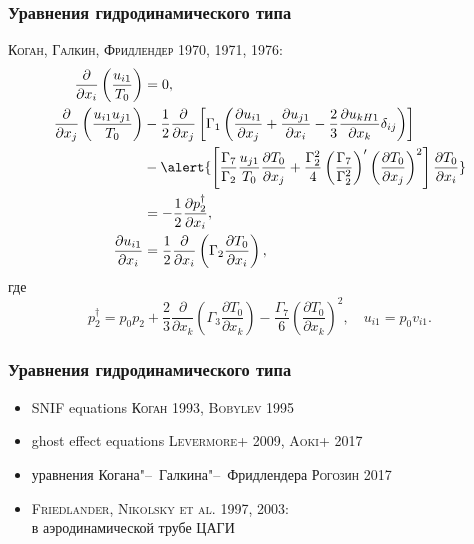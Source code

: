\documentclass[mathserif]{beamer} %
\newcommand{\pder}[2][]{\frac{\partial#1}{\partial#2}}
\newcommand{\Cite}[2][]{\alert{\textsc{#2 #1}}}
\begin{document}
\begin{frame}
    \frametitle{Уравнения гидродинамического типа}
    \Cite[1970, 1971, 1976]{Коган, Галкин, Фридлендер}:
    \begin{align*}
        \pder{x_i}\left(\frac{u_{i1}}{T_0}\right) &= 0, \\
        \pder{x_j}\left(\frac{u_{i1}u_{j1}}{T_0}\right)
            &-\frac12\pder{x_j}\left[\Gamma_1\left(
                \pder[u_{i1}]{x_j} + \pder[u_{j1}]{x_i} - \frac23\pder[u_{kH1}]{x_k}\delta_{ij}
            \right)\right] \notag\\
            &-\alert{\left[
                \frac{\Gamma_7}{\Gamma_2}\frac{u_{j1}}{T_0}\pder[T_0]{x_j}
                + \frac{\Gamma_2^2}4 \left(\frac{\Gamma_7}{\Gamma_2^2}\right)'
                    \left(\pder[T_0]{x_j}\right)^2
            \right]\pder[T_0]{x_i}} \notag\\
            &= -\frac12\pder[p_2^\dag]{x_i}, \\
        \pder[u_{i1}]{x_i} &= \frac12\pder{x_i}\left(\Gamma_2\pder[T_0]{x_i}\right),
    \end{align*}
    где
    \begin{equation*}
        p_2^\dag = p_0 p_2
            + \frac23\pder{x_k}\left(\Gamma_3\pder[T_0]{x_k}\right)
            - \frac{\Gamma_7}{6}\left(\pder[T_0]{x_k}\right)^2, \quad u_{i1} = p_0v_{i1}.
    \end{equation*}
\end{frame}

\begin{frame}
    \frametitle{Уравнения гидродинамического типа}
    \vspace{10pt}
    \begin{itemize}
        \item SNIF equations \Cite[1993]{Коган}, \Cite[1995]{Bobylev}
        \item ghost effect equations \Cite[2009]{Levermore+}, \Cite[2017]{Aoki+}
        \item уравнения Когана"--~Галкина"--~Фридлендера \Cite[2017]{Рогозин}
    \end{itemize}

    \begin{itemize}
        \item \Cite[1997, 2003]{Friedlander, Nikolsky et al.}:\\
            в аэродинамической трубе ЦАГИ
    \end{itemize}
\end{frame}
\end{document}
